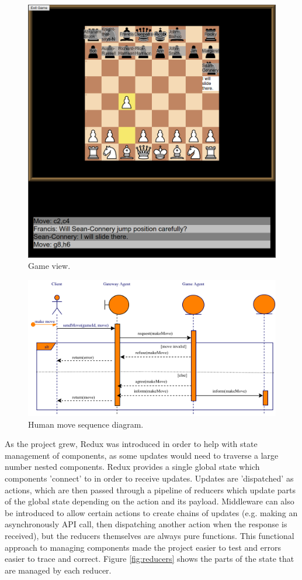 \documentclass{article}
\begin{document}
\begin{figure}[!h]
	\centering
	\includegraphics[width=0.8\linewidth]{images/gameview}
	\caption{Game view.}
	\label{fig:gameview}
\end{figure}

\begin{figure}[!h]
	\centering
	\includegraphics[width=\linewidth]{images/humanmove}
	\caption{Human move sequence diagram.}
	\label{fig:humanmove}
\end{figure}

As the project grew, Redux \cite{redux} was introduced in order to help with state management of components, as some updates would need to traverse a large number nested components. Redux provides a single global state which components 'connect' to in order to receive updates. Updates are 'dispatched' as actions, which are then passed through a pipeline of reducers which update parts of the global state depending on the action and its payload. Middleware can also be introduced to allow certain actions to create chains of updates (e.g. making an asynchronously API call, then dispatching another action when the response is received), but the reducers themselves are always pure functions. This functional approach to managing components made the project easier to test and errors easier to trace and correct. Figure \ref{fig:reducers} shows the parts of the state that are managed by each reducer.
\end{document}
